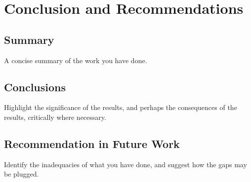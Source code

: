 
\chapter{Conclusion and Recommendations}
\begin{spacing}{1.5}
\setlength{\parskip}{0.3in}

\section{Summary}

A concise summary of the work you have done.

\section{Conclusions}

Highlight the significance of the results, and perhaps the consequences of the results, critically where necessary.

\section{Recommendation in Future Work}

Identify the inadequacies of what you have done, and suggest how the gaps may be plugged.


\end{spacing}
\newpage
